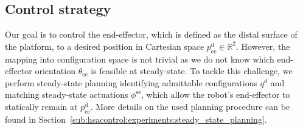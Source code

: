 \subsection{Control strategy}\label{sub:hsacontrol:configuration_space_regulation:control_strategy}

Our goal is to control the end-effector, which is defined as the distal surface of the platform, to a desired position in Cartesian space $p_\mathrm{ee}^\mathrm{d} \in \mathbb{R}^2$. 
However, the mapping into configuration space is not trivial as we do not know which end-effector orientation $\theta_\mathrm{ee}$ is feasible at steady-state. 
To tackle this challenge, we perform steady-state planning identifying admittable configurations $q^\mathrm{d}$ and matching steady-state actuations $\phi^\mathrm{ss}$, which allow the robot's end-effector to statically remain at $p_\mathrm{ee}^\mathrm{d}$. More details on the used planning procedure can be found in Section~\ref{sub:hsacontrol:experiments:steady_state_planning}.

